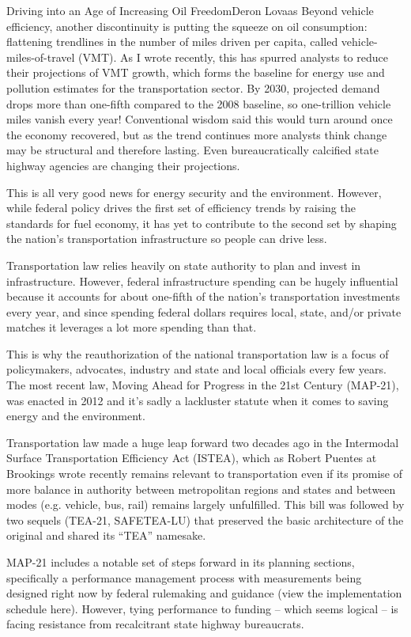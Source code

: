 \documentclass[10pt]{papertex}
\begin{document}
\begin{news}{2}{Driving into an Age of Increasing Oil Freedom}{Deron Lovaas}{}{}
Beyond vehicle efficiency, another discontinuity is putting the squeeze on oil 
consumption: flattening trendlines in the number of miles driven per capita, 
called vehicle-miles-of-travel (VMT). As I wrote recently, this has spurred 
analysts to reduce their projections of VMT growth, which forms the baseline 
for energy use and pollution estimates for the transportation sector. By 2030, 
projected demand drops more than one-fifth compared to the 2008 baseline, so 
one-trillion vehicle miles vanish every year! Conventional wisdom said this 
would turn around once the economy recovered, but as the trend continues more 
analysts think change may be structural and therefore lasting. Even 
bureaucratically calcified state highway agencies are changing their 
projections.

This is all very good news for energy security and the environment. However, 
while federal policy drives the first set of efficiency trends by raising the 
standards for fuel economy, it has yet to contribute to the second set by 
shaping the nation’s transportation infrastructure so people can drive less.

Transportation law relies heavily on state authority to plan and invest in 
infrastructure. However, federal infrastructure spending can be hugely 
influential because it accounts for about one-fifth of the nation’s 
transportation investments every year, and since spending federal dollars 
requires local, state, and/or private matches it leverages a lot more spending 
than that.

This is why the reauthorization of the national transportation law is a focus 
of policymakers, advocates, industry and state and local officials every few 
years. The most recent law, Moving Ahead for Progress in the 21st Century 
(MAP-21), was enacted in 2012 and it’s sadly a lackluster statute when it 
comes to saving energy and the environment.

Transportation law made a huge leap forward two decades ago in the Intermodal 
Surface Transportation Efficiency Act (ISTEA), which as Robert Puentes at 
Brookings wrote recently remains relevant to transportation even if its 
promise of more balance in authority between metropolitan regions and states 
and between modes (e.g. vehicle, bus, rail) remains largely unfulfilled. This 
bill was followed by two sequels (TEA-21, SAFETEA-LU) that preserved the basic 
architecture of the original and shared its “TEA” namesake.

MAP-21 includes a notable set of steps forward in its planning sections, 
specifically a performance management process with measurements being designed 
right now by federal rulemaking and guidance (view the implementation schedule 
here). However, tying performance to funding – which seems logical – is facing 
resistance from recalcitrant state highway bureaucrats.


\end{news}
\end{document}
